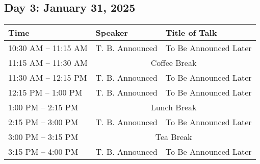\subsection*{Day 3: January 31, 2025}

\noindent\begin{tabular}{|p{3.5cm}|p{4cm}|p{7cm}|}
\hline
\rowcolor{gray!20} \textbf{Time} & \textbf{Speaker} & \textbf{Title of Talk} \\
\hline
10:30 AM -- 11:15 AM & T. B. Announced & To Be Announced Later \\
\hline
\rowcolor{yellow!30} 11:15 AM -- 11:30 AM & \multicolumn{2}{|c|}{Coffee Break} \\
\hline
11:30 AM -- 12:15 PM & T. B. Announced & To Be Announced Later \\
\hline
12:15 PM -- 1:00 PM & T. B. Announced & To Be Announced Later \\
\hline
\rowcolor{yellow!30} 1:00 PM -- 2:15 PM & \multicolumn{2}{|c|}{Lunch Break} \\
\hline
2:15 PM -- 3:00 PM & T. B. Announced & To Be Announced Later \\
\hline
\rowcolor{yellow!30} 3:00 PM -- 3:15 PM & \multicolumn{2}{|c|}{Tea Break} \\
\hline
3:15 PM -- 4:00 PM & T. B. Announced & To Be Announced Later \\
\hline
\end{tabular}

